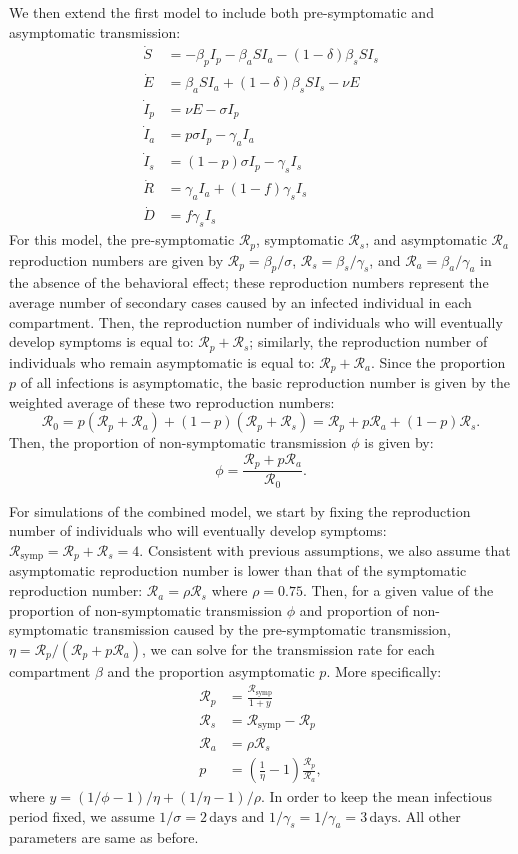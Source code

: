 \documentclass[12pt]{article}
\newcommand{\RR}{\ensuremath{{\mathcal R}}\xspace}
\begin{document}
We then extend the first model to include both pre-symptomatic and asymptomatic transmission:
\begin{align}
\dot{S} &= -\beta_p I_p -\beta_a S I_a -(1-\delta) \beta_s S I_s \\
\dot{E} &= \beta_a S I_a + (1-\delta) \beta_s S I_s - \nu E\\
\dot{I}_p &= \nu E - \sigma I_p\\
\dot{I}_a &= p \sigma I_p - \gamma_a I_a\\
\dot{I}_s &= (1-p) \sigma I_p -\gamma_s I_s\\
\dot{R} &= \gamma_a I_a + (1-f) \gamma_s I_s \\
\dot{D} &= f \gamma_s I_s
\end{align}
For this model, the pre-symptomatic $\RR_p$, symptomatic $\RR_s$, and asymptomatic $\RR_a$ reproduction numbers are given by $\RR_p = \beta_p/\sigma$, $\RR_s=\beta_s/\gamma_s$, and $\RR_a=\beta_a/\gamma_a$ in the absence of the behavioral effect;
these reproduction numbers represent the average number of secondary cases caused by an infected individual in each compartment.
Then, the reproduction number of individuals who will eventually develop symptoms is equal to: $\RR_p + \RR_s$;
similarly, the reproduction number of individuals who remain asymptomatic is equal to: $\RR_p + \RR_a$.
Since the proportion $p$ of all infections is asymptomatic, the basic reproduction number is given by the weighted average of these two reproduction numbers: 
\begin{equation}
\RR_0 = p(\RR_p + \RR_a) + (1-p) (\RR_p + \RR_s) = \RR_p + p \RR_a + (1-p) \RR_s.
\end{equation}
Then, the proportion of non-symptomatic transmission $\phi$ is given by:
\begin{equation}
\phi = \frac{\RR_p + p \RR_a}{\RR_0}.
\end{equation}

For simulations of the combined model, we start by fixing the reproduction number of individuals who will eventually develop symptoms: $\RR_{\textrm{symp}} = \RR_p + \RR_s = 4$. 
Consistent with previous assumptions, we also assume that asymptomatic reproduction number is lower than that of the symptomatic reproduction number: $\RR_a = \rho \RR_s$ where $\rho = 0.75$.
Then, for a given value of the proportion of non-symptomatic transmission $\phi$ and proportion of non-symptomatic transmission caused by the pre-symptomatic transmission, $\eta = \RR_p/(\RR_p + p \RR_a)$, we can solve for the transmission rate for each compartment $\beta$ and the proportion asymptomatic $p$.
More specifically:
\begin{align}
\RR_p &= \frac{\RR_{\textrm{symp}}}{1 + y}\\
\RR_s &= \RR_{\textrm{symp}} - \RR_p\\
\RR_a &=  \rho \RR_s\\
p &= \left(\frac{1}{\eta} - 1 \right) \frac{\RR_p}{\RR_a},
\end{align}
where $y = (1/\phi - 1)/\eta + (1/\eta - 1)/\rho$.
In order to keep the mean infectious period fixed, we assume $1/\sigma=2\,\mathrm{days}$ and $1/\gamma_s=1/\gamma_a=3\,\mathrm{days}$.
All other parameters are same as before.
\end{document}
